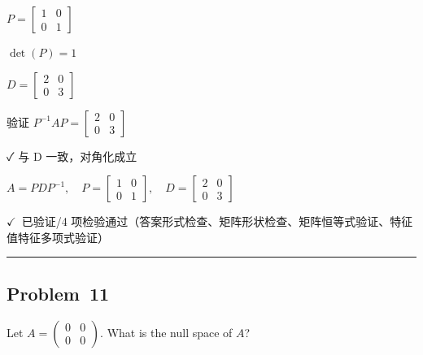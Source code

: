 \documentclass[12pt, a4paper]{article}
\newcommand{\problem}[1]{\subsection*{Problem~#1}}
\newcommand{\verifyok}{\textcolor{solutiongreen}{\ensuremath{\checkmark}\ 已验证}}
\begin{document}
\begin{stepbox}
$P = \left[\begin{matrix}1 & 0\\0 & 1\end{matrix}\right]$
\end{stepbox}

\begin{stepbox}
$\det(P) = 1$
\end{stepbox}

\begin{stepbox}
$D = \left[\begin{matrix}2 & 0\\0 & 3\end{matrix}\right]$
\end{stepbox}

\begin{stepbox}
验证 $P^{-1}AP = \left[\begin{matrix}2 & 0\\0 & 3\end{matrix}\right]$
\end{stepbox}

\begin{stepbox}
✓ 与 D 一致，对角化成立
\end{stepbox}

\begin{center}
$\boxed{A = PDP^{-1},\quad P = \left[\begin{matrix}1 & 0\\0 & 1\end{matrix}\right],\quad D = \left[\begin{matrix}2 & 0\\0 & 3\end{matrix}\right]}$
\end{center}

\begin{verifybox}\small \verifyok{}/4 项检验通过（答案形式检查、矩阵形状检查、矩阵恒等式验证、特征值特征多项式验证） \end{verifybox}

\vspace{0.8em}\hrule\vspace{0.8em}

\problem{11}

\begin{stepbox}
Let $A = \begin{pmatrix} 0 & 0 \\ 0 & 0 \end{pmatrix}$. What is the null space of $A$?
\end{stepbox}
\end{document}
